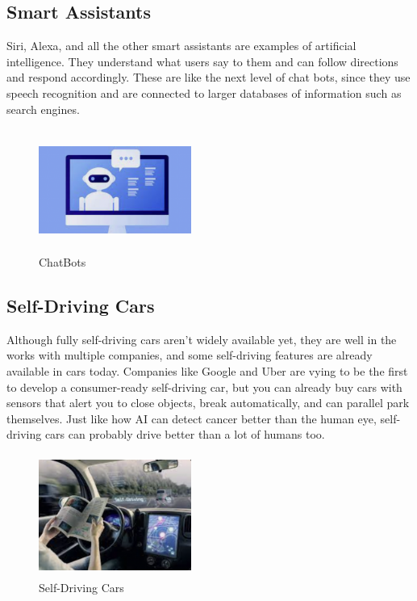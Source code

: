 \documentclass[conference]{IEEEtran}
\begin{document}
\subsection{Smart Assistants}
Siri, Alexa, and all the other smart assistants are examples of artificial intelligence. They understand what users say to them and can follow directions and respond accordingly. These are like the next level of chat bots, since they use speech recognition and are connected to larger databases of information such as search engines.\\
\begin{figure}[htbp]
\centerline{\includegraphics[width=5cm, height=4cm]{chatbots}}
\caption{ChatBots}
\label{fig}
\end{figure}

\subsection{Self-Driving Cars}
Although fully self-driving cars aren’t widely available yet, they are well in the works with multiple companies, and some self-driving features are already available in cars today. Companies like Google and Uber are vying to be the first to develop a consumer-ready self-driving car, but you can already buy cars with sensors that alert you to close objects, break automatically, and can parallel park themselves. Just like how AI can detect cancer better than the human eye, self-driving cars can probably drive better than a lot of humans too.\\
\begin{figure}[htbp]
\centerline{\includegraphics[width=5cm, height=4cm]{selfdriving cars}}
\caption{Self-Driving Cars}
\label{fig}
\end{figure}
\end{document}
